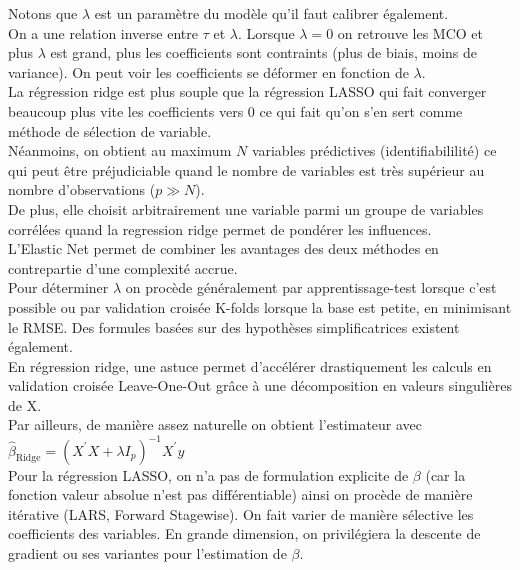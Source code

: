 \documentclass[french]{article}
\begin{document}
\begin{multicols}{2}
Notons que $\lambda$ est un paramètre du modèle qu'il faut calibrer également.\\
On a une relation inverse entre $\tau$ et $\lambda$. Lorsque $\lambda=0$ on retrouve les MCO et plus $\lambda$ est grand, plus les coefficients sont contraints (plus de biais, moins de variance).
On peut voir les coefficients se déformer en fonction de $\lambda$.\\
La régression ridge est plus souple que la régression LASSO qui fait converger beaucoup plus vite les coefficients vers 0 ce qui fait qu'on s'en sert comme méthode de sélection de variable.\\Néanmoins, on obtient au maximum $N$  variables prédictives (identifiabililité) ce qui peut être préjudiciable quand le nombre de variables est très supérieur au nombre d'observations ($p \gg N$).\\
De plus, elle choisit arbitrairement une variable parmi un groupe de variables corrélées quand la regression ridge permet de pondérer les influences.\\
L'Elastic Net permet de combiner les avantages des deux méthodes en contrepartie d'une complexité accrue.\\

Pour déterminer $\lambda$ on procède généralement par apprentissage-test lorsque c'est possible ou par validation croisée K-folds lorsque la base est petite, en minimisant le RMSE. Des formules basées sur des hypothèses simplificatrices existent également.\\
En régression ridge, une astuce permet d'accélérer drastiquement les calculs en validation croisée Leave-One-Out grâce à une décomposition en valeurs singulières de X.\\
Par ailleurs, de manière assez naturelle on obtient l'estimateur avec  $\hat{\beta}_{\text {Ridge}}=\left(X^{\prime} X+\lambda I_{p}\right)^{-1} X^{\prime} y$\\


Pour la régression LASSO, on n'a pas de formulation explicite de $\beta$ (car la fonction valeur absolue n'est pas différentiable) ainsi on procède de manière itérative (LARS, Forward Stagewise). On fait varier de manière sélective les coefficients des variables. En grande dimension, on privilégiera la descente de gradient ou ses variantes pour l'estimation de $\beta$.\\

\end{multicols}
\end{document}
